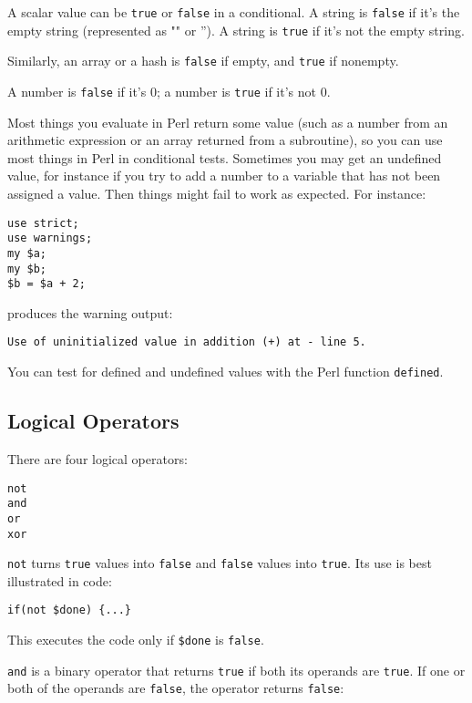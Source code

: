 A scalar value can be \verb|true| or \verb|false| in a conditional. A string is \verb|false| if it's the empty string (represented as "" or ''). A string is \verb|true| if it's not the empty string.

Similarly, an array or a hash is \verb|false| if empty, and \verb|true| if nonempty.

A number is \verb|false| if it's 0; a number is \verb|true| if it's not 0.

Most things you evaluate in Perl return some value (such as a number from an arithmetic expression or an array returned from a subroutine), so you can use most things in Perl in conditional tests. Sometimes you may get an undefined value, for instance if you try to add a number to a variable that has not been assigned a value. Then things might fail to work as expected. For instance:

\begin{lstlisting}
use strict;
use warnings;
my $a;
my $b;
$b = $a + 2;
\end{lstlisting}

produces the warning output:

\begin{lstlisting}
Use of uninitialized value in addition (+) at - line 5.
\end{lstlisting}

You can test for defined and undefined values with the Perl function \verb|defined|.

\subsection{Logical Operators}
There are four logical operators:

\begin{lstlisting}
not
and
or
xor
\end{lstlisting}

\verb|not| turns \verb|true| values into \verb|false| and \verb|false| values into \verb|true|. Its use is best illustrated in code:

\begin{lstlisting}
if(not $done) {...}
\end{lstlisting}

This executes the code only if \verb|$done| is \verb|false|.

\verb|and| is a binary operator that returns \verb|true| if both its operands are \verb|true|. If one or both of the operands are \verb|false|, the operator returns \verb|false|:

